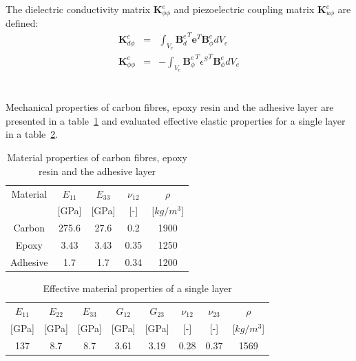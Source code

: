 \documentclass[materials,article,submit,moreauthors,pdftex]{Definitions/mdpi}
\begin{document}
The dielectric conductivity matrix \(\textbf{K}_{\phi \phi}^e\) and piezoelectric coupling matrix \(\textbf{K}_{u \phi}^e\) are defined:
\begin{eqnarray}
\textbf{K}_{d\phi}^e & = & \int_{V_e}{\textbf{B}_d^e}^T\textbf{e}^T \textbf{B}_{\phi}^ed V_e\\
\textbf{K}_{\phi \phi}^e & = & -\int_{V_e}{\textbf{B}_{\phi}^e}^T 
{\textbf{\(\epsilon\)}^S}^T \textbf{B}_{\phi}^edV_e
\end{eqnarray}

\section{}
\label{app:properties}
Mechanical properties of carbon fibres, epoxy resin and the adhesive layer are presented in a table~\ref{tab:properties} and evaluated effective elastic properties for a single layer in a table~\ref{tab:properties_layer}.
\begin{table}
	\centering
	\caption{\label{tab:properties}Material properties of carbon fibres, epoxy 
		resin and the adhesive layer}
	\begin{tabular}{ccccc}\hline
		Material & \(E_{11}\) &  \(E_{33}\) & \(\nu_{12}\) & \(\rho\) \\
		& [GPa] &  [GPa] & [-] & [\(kg/m^3\)]\\
		\hline
		Carbon & 275.6 & 27.6 & 0.2 & 1900\\
		Epoxy & 3.43 & 3.43 & 0.35 & 1250\\
		Adhesive & 1.7 & 1.7 & 0.34 & 1200\\
	\end{tabular}
\end{table}

\begin{table}
	\centering
	\caption{\label{tab:properties_layer}Effective material properties of a single 
		layer}
	\begin{tabular}{cccccccc}
		\hline
		\(E_{11}\) & \(E_{22}\) & \(E_{33}\) & \(G_{12}\) & \(G_{23}\) & \(\nu_{12}\) 
		& \(\nu_{23}\) & \(\rho\) \\
		\([\)GPa] & [GPa] & [GPa] & [GPa] & [GPa] & [-] & [-] & [\(kg/m^3\)]\\
		\hline
		137 & 8.7 & 8.7 & 3.61 & 3.19 & 0.28 & 0.37 & 1569\\
		\hline
	\end{tabular}
\end{table}
\end{document}
